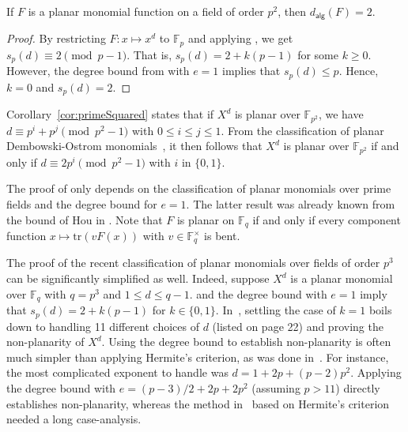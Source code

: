 \documentclass[12pt]{article}
\newcommand{\F}{\mathbb{F}}
\newcommand{\tr}{\mathrm{tr}}
\newcommand{\wt}{s_p}
\newcommand{\adeg}[1]{d_{\mathsf{alg}}(#1)}
\begin{document}
\begin{corollary}
\label{cor:primeSquared}
If $F$ is a planar monomial function on a field of order $p^2$, then $\adeg{F} = 2$.
\end{corollary}
\begin{proof}
By restricting $F : x \mapsto x^d$ to $\F_p$ and applying , we get $\wt(d) \equiv 2 \pmod{p - 1}$.
That is, $\wt(d) = 2 + k(p - 1)$ for some $k \ge 0$. However, the degree bound from  with $e = 1$ implies that $\wt(d) \le p$.
Hence, $k = 0$ and $\wt(d) = 2$.
\end{proof}

Corollary~\ref{cor:primeSquared} states that if $X^d$ is planar over $\F_{p^2}$, we have $d \equiv p^i + p^j \pmod {p^2-1}$ with $0 \leq i \leq j \leq 1$. From the classification of planar Dembowski-Ostrom monomials~\cite{DBLP:journals/dcc/CoulterM97}, it then follows that $X^d$ is planar over $\F_{p^2}$ if and only if $d \equiv 2p^i \pmod {p^2-1}$ with $i$ in $\{0,1\}$.

\begin{remark}
    The proof of  only depends on the classification of planar monomials over prime fields and the degree bound for $e=1$. The latter result was already known from the bound of Hou in \cite[Proposition 4.4]{DBLP:journals/ffa/Hou04}. Note that $F$ is planar on $\F_q$ if and only if every component function $x \mapsto \tr(vF(x))$ with $v \in \F_q^\times$ is bent.
\end{remark}

\begin{remark}
    The proof of the recent classification of planar monomials over fields of order $p^3$ can be significantly simplified as well. Indeed, suppose $X^d$ is a planar monomial over $\F_q$ with $q = p^3$ and $1 \leq d \leq q-1$.  and the degree bound with $e=1$ imply that $s_p(d) = 2 + k(p-1)$ for $k \in \{0,1\}$. In~\cite{DBLP:journals/ffa/BergmanCV22}, settling the case of $k=1$ boils down to handling 11 different choices of $d$ (listed on page 22) and proving the non-planarity of $X^d$. Using the degree bound to establish non-planarity is often much simpler than applying Hermite's criterion, as was done in~\cite{DBLP:journals/ffa/BergmanCV22}. For instance, the most complicated exponent to handle was $d = 1 + 2p + (p-2)p^2$. Applying the degree bound with $e = (p-3)/2 + 2p + 2p^2$ (assuming $p> 11$) directly establishes non-planarity, whereas the method in~\cite{DBLP:journals/ffa/BergmanCV22} based on Hermite's criterion needed a long case-analysis.
\end{remark}
\end{document}

